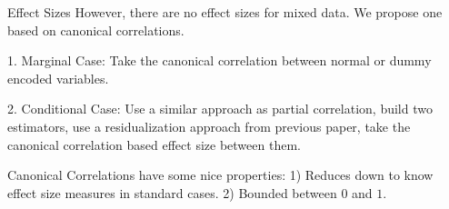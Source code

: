 \documentclass{beamer}
\begin{document}
\begin{frame}{Effect Sizes}
	However, there are no effect sizes for mixed data. We propose one based on
	canonical correlations.

	1. Marginal Case: Take the canonical correlation between normal or dummy encoded variables.

	2. Conditional Case: Use a similar approach as partial correlation, build two 
		estimators, use a residualization approach from previous paper, take
		the canonical correlation based effect size between them.


\end{frame}

\begin{frame}

	Canonical Correlations have some nice properties: 1) Reduces down to know effect size measures in standard cases. 2) Bounded between $ 0 $ and $ 1 $.

\end{frame}
\end{document}
